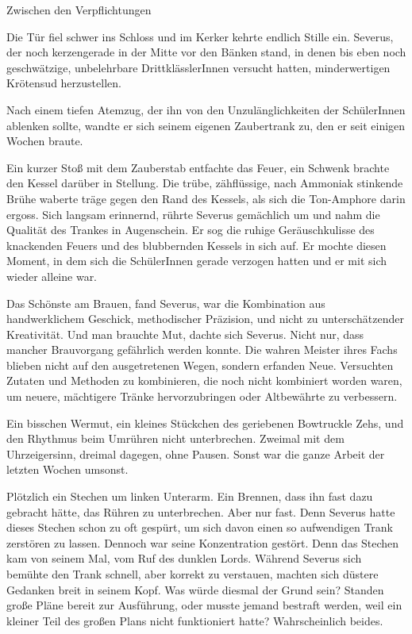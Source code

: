 \documentclass[fontsize=12pt]{scrartcl}
\begin{document}
	{\huge Zwischen den Verpflichtungen}
	\vspace{15pt}
	
	{\LARGE D}ie Tür fiel schwer ins Schloss und  im Kerker kehrte endlich Stille ein. Severus, der noch kerzengerade in der Mitte vor den Bänken stand, in denen bis eben noch geschwätzige, unbelehrbare DrittklässlerInnen versucht hatten, minderwertigen Krötensud herzustellen. 
	
	Nach einem tiefen Atemzug, der ihn von den Unzulänglichkeiten der SchülerInnen ablenken sollte, wandte er sich seinem eigenen Zaubertrank zu, den er seit einigen Wochen braute. 
	
	Ein kurzer Stoß mit dem Zauberstab entfachte das Feuer, ein Schwenk brachte den Kessel darüber in Stellung. 
	Die trübe, zähflüssige, nach Ammoniak stinkende Brühe waberte träge gegen den Rand des Kessels, als sich die Ton-Amphore darin ergoss.
	Sich langsam erinnernd, rührte Severus gemächlich um und nahm die Qualität des Trankes in Augenschein. 
	Er sog die ruhige Geräuschkulisse des knackenden Feuers und des blubbernden Kessels in sich auf. 
	Er mochte diesen Moment, in dem sich die SchülerInnen gerade verzogen hatten und er mit sich wieder alleine war. 
	
	Das Schönste am Brauen, fand Severus, war die Kombination aus handwerklichem Geschick, methodischer Präzision, und nicht zu unterschätzender Kreativität. 
	Und man brauchte Mut, dachte sich Severus. 
	Nicht nur, dass mancher Brauvorgang gefährlich werden konnte. Die wahren Meister ihres Fachs blieben nicht auf den ausgetretenen Wegen, sondern erfanden Neue. 
	Versuchten Zutaten und Methoden zu kombinieren, die noch nicht kombiniert worden waren, um neuere, mächtigere Tränke hervorzubringen oder Altbewährte zu verbessern. 
	
	Ein bisschen Wermut, ein kleines Stückchen des geriebenen Bowtruckle Zehs, und den Rhythmus beim Umrühren nicht unterbrechen. Zweimal mit dem Uhrzeigersinn, dreimal dagegen, ohne Pausen. 
	Sonst war die ganze Arbeit der letzten Wochen umsonst.
	
	Plötzlich ein Stechen um linken Unterarm. Ein Brennen, dass ihn fast dazu gebracht hätte, das Rühren zu unterbrechen. Aber nur fast. 
	Denn Severus hatte dieses Stechen schon zu oft gespürt, um sich davon einen so aufwendigen Trank zerstören zu lassen. Dennoch war seine Konzentration gestört. 
	Denn das Stechen kam von seinem Mal, vom Ruf des dunklen Lords. Während Severus sich bemühte den Trank schnell, aber korrekt zu verstauen, machten sich düstere Gedanken breit in seinem Kopf. 
	Was würde diesmal der Grund sein? Standen große Pläne bereit zur Ausführung, oder musste jemand bestraft werden, weil ein kleiner Teil des großen Plans nicht funktioniert hatte? Wahrscheinlich beides.
	
\end{document}
